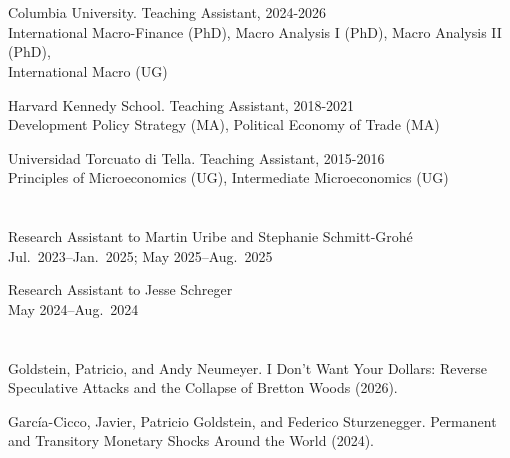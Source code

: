 \documentclass[margin,line]{res}
\newenvironment{list1}{
  \begin{list}{\ding{113}}{%
      \setlength{\itemsep}{0in}
      \setlength{\parsep}{0in} \setlength{\parskip}{0in}
      \setlength{\topsep}{0in} \setlength{\partopsep}{0in}
      \setlength{\leftmargin}{0.17in}}}{\end{list}}
\begin{document}
\begin{resume}

\vspace*{.1in}

\section{{}}

\begin{list1}
\item[] {\sc Columbia University.} Teaching Assistant, 2024-2026 \\
International Macro-Finance (PhD), Macro Analysis I (PhD), Macro Analysis II (PhD), \\
International Macro (UG)
\end{list1}
\vspace{5pt}

\begin{list1}
\item[] {\sc Harvard Kennedy School.} Teaching Assistant, 2018-2021 \\ 
Development Policy Strategy (MA), Political Economy of Trade (MA)
\end{list1}
\vspace{5pt}
\begin{list1}
\item[] {\sc Universidad Torcuato di Tella.} Teaching Assistant, 2015-2016 \\
Principles of Microeconomics (UG), Intermediate Microeconomics (UG)
\end{list1}

\section{{}}
\begin{list1}
\item[] Research Assistant to Martin Uribe and Stephanie Schmitt-Grohé \\
       \hspace*{0.8em}Jul.\ 2023--Jan.\ 2025; May 2025--Aug.\ 2025
\item[] Research Assistant to Jesse Schreger \\
       \hspace*{0.8em}May 2024--Aug.\ 2024
\end{list1}

\section{{}}
\begin{list1}
\item[] Goldstein, Patricio, and Andy Neumeyer. I Don't Want Your Dollars: Reverse Speculative Attacks and the Collapse of Bretton Woods (2026).
\item[] García-Cicco, Javier, Patricio Goldstein, and Federico Sturzenegger. Permanent and Transitory Monetary Shocks Around the World (2024).
\end{list1}


\end{resume}
\end{document}
